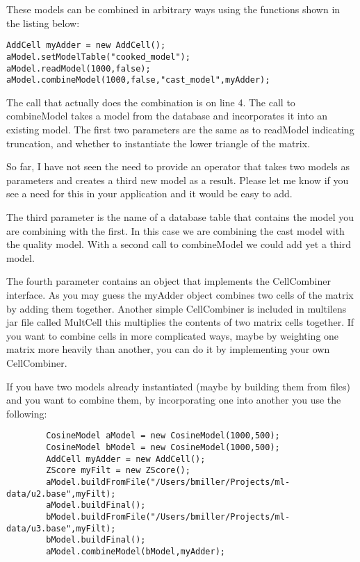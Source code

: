 \documentclass[12pt]{article}
\begin{document}
These models can be combined in arbitrary ways using the functions
shown in the listing below:
\begin{lstlisting}
AddCell myAdder = new AddCell();
aModel.setModelTable("cooked_model");
aModel.readModel(1000,false);
aModel.combineModel(1000,false,"cast_model",myAdder);
\end{lstlisting}

The call that actually does the combination is on line 4.  The call to
combineModel takes a model from the database and incorporates it into
an existing model.  The first two parameters are the same as to
readModel indicating truncation, and whether to instantiate the lower
triangle of the matrix.

So far, I have not seen the need to provide an operator that takes two
models as parameters and creates a third new model as a result.
Please let me know if you see a need for this in your application and
it would be easy to add.

The third parameter is the name of a database table that contains the
model you are combining with the first.  In this case we are combining
the cast model with the quality model.  With a second call to
combineModel we could add yet a third model.

The fourth parameter contains an object that implements the
CellCombiner interface.  As you may guess the myAdder object combines
two cells of the matrix by adding them together.  Another simple
CellCombiner is included in multilens jar file called MultCell this
multiplies the contents of two matrix cells together.  If you want to
combine cells in more complicated ways, maybe by weighting one matrix
more heavily than another, you can do it by implementing your own
CellCombiner.

If you have two models already instantiated (maybe by building them
from files) and you want to combine
them, by incorporating one into another you use the following:

\begin{lstlisting}
        CosineModel aModel = new CosineModel(1000,500);
        CosineModel bModel = new CosineModel(1000,500);
        AddCell myAdder = new AddCell();
        ZScore myFilt = new ZScore();
        aModel.buildFromFile("/Users/bmiller/Projects/ml-data/u2.base",myFilt);
        aModel.buildFinal();
        bModel.buildFromFile("/Users/bmiller/Projects/ml-data/u3.base",myFilt);
        bModel.buildFinal();
        aModel.combineModel(bModel,myAdder);
\end{lstlisting}
\end{document}
